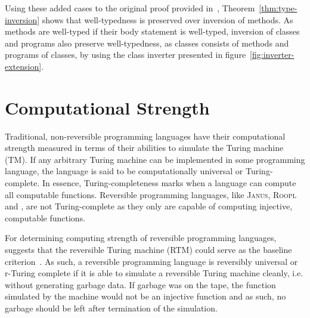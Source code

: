 Using these added cases to the original proof provided in~\cite{th:roopl}, Theorem~\ref{thm:type-inversion} shows that well-typedness is preserved over inversion of \rooplpp methods. As methods are well-typed if their body statement is well-typed, inversion of classes and programs also preserve well-typedness, as classes consists of methods and programs of classes, by using the class inverter presented in figure~\ref{fig:inverter-extension}.  


\section{Computational Strength}
\label{sec:computational-strength}
Traditional, non-reversible programming languages have their computational strength measured in terms of their abilities to simulate the Turing machine (TM). If any arbitrary Turing machine can be implemented in some programming language, the language is said to be computationally universal or Turing-complete. In essence, Turing-completeness marks when a language can compute all computable functions. Reversible programming languages, like \textsc{Janus}, \textsc{Roopl} and \rooplpp, are not Turing-complete as they only are capable of computing injective, computable functions.

For determining computing strength of reversible programming languages,~\citeauthor{ty:ejanus} suggests that the reversible Turing machine (RTM) could serve as the baseline criterion~\cite{ty:ejanus}. As such, a reversible programming language is reversibly universal or r-Turing complete if it is able to simulate a reversible Turing machine cleanly, i.e. without generating garbage data. If garbage was on the tape, the function simulated by the machine would not be an injective function and as such, no garbage should be left after termination of the simulation.

